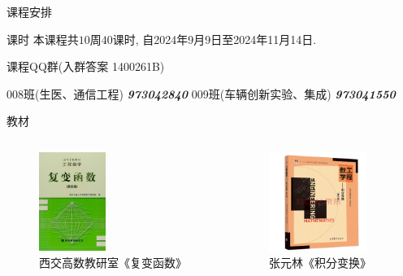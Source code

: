 \begin{frame}{课程安排}
	\onslide<+->
	\begin{block*}{课时}
		本课程共$10$周$40$课时, 自2024年9月9日至2024年11月14日.
	\end{block*}
	
	\onslide<+->
	\begin{block}{课程QQ群(入群答案 1400261B)}
		\begin{center}
			008班(生医、通信工程) \emph{\textbf{973042840}}
			\hspace{5mm}
			009班(车辆创新实验、集成) \emph{\textbf{973041550}}
		\end{center}
	\end{block}

	\onslide<+->
	\begin{block}{教材}
		\vspace{-5mm}
		\begin{columns}
			\begin{figure}
				\includegraphics[height=32mm]{../image/book1.jpg}
				\caption{西交高数教研室《复变函数》}
			\end{figure}
			\begin{figure}
				\includegraphics[height=32mm]{../image/book2.png}
				\caption{张元林《积分变换》}
			\end{figure}
		\end{columns}
		\vspace{-4mm}
	\end{block}
\end{frame}


